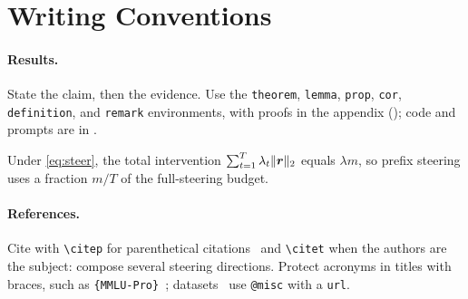 \section{Writing Conventions}

\paragraph{Results.} State the claim, then the evidence. Use the \texttt{theorem}, \texttt{lemma}, \texttt{prop}, \texttt{cor}, \texttt{definition}, and \texttt{remark} environments, with proofs in the appendix (); code and prompts are in .

\begin{prop}\label{prop:budget}
Under \cref{eq:steer}, the total intervention $\sum_{t=1}^{T} \lambda_t \|\boldsymbol{r}\|_2$ equals $\lambda m$, so prefix steering uses a fraction $m/T$ of the full-steering budget.
\end{prop}

\paragraph{References.} Cite with \texttt{\textbackslash citep} for parenthetical citations~\citep{chowdhery2023palm, achiam2023gpt} and \texttt{\textbackslash citet} when the authors are the subject: \citet{scalena2024multiproperty} compose several steering directions. Protect acronyms in titles with braces, such as \texttt{\{MMLU-Pro\}}~\citep{wang2024mmlu}; datasets~\citep{politeguard} use \texttt{@misc} with a \texttt{url}.

